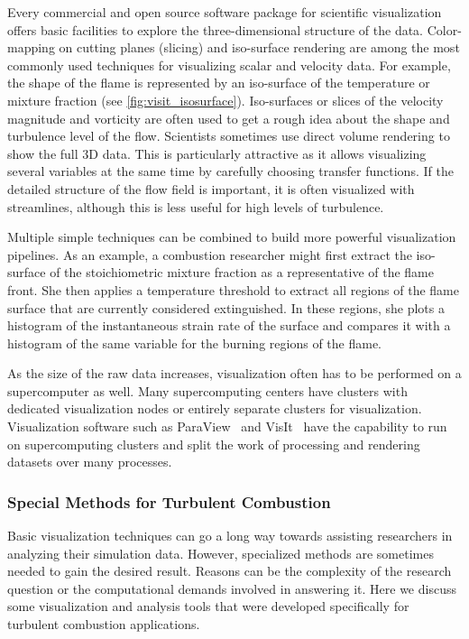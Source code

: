 %
Every commercial and open source software package for scientific visualization
offers basic facilities to explore the three-dimensional structure of the data.
%
Color-mapping on cutting planes (slicing) and iso-surface rendering are among
the most commonly used techniques for visualizing scalar and velocity data.
%
For example, the shape of the flame is represented by an iso-surface of the
temperature or mixture fraction (see \cref{fig:visit_isosurface}).
%
Iso-surfaces or slices of the velocity magnitude and vorticity are often used to
get a rough idea about the shape and turbulence level of the flow.
%
Scientists sometimes use direct volume rendering to show the full \ac{3D} data.
%
This is particularly attractive as it allows visualizing several variables at
the same time by carefully choosing transfer functions.
%
If the detailed structure of the flow field is important, it is often visualized
with streamlines, although this is less useful for high levels of turbulence.
%

%
Multiple simple techniques can be combined to build more powerful visualization
pipelines.
%
As an example, a combustion researcher might first extract the iso-surface of
the stoichiometric mixture fraction as a representative of the flame front.
%
She then applies a temperature threshold to extract all regions of the flame
surface that are currently considered extinguished.
%
In these regions, she plots a histogram of the instantaneous strain rate of the
surface and compares it with a histogram of the same variable for the burning
regions of the flame.
%

%
As the size of the raw data increases, visualization often has to be performed
on a supercomputer as well.
%
Many supercomputing centers have clusters with dedicated visualization nodes or
entirely separate clusters for visualization.
%
Visualization software such as ParaView~\cite{Ahrens2005} and
VisIt~\cite{HPV:VisIt} have the capability to run on supercomputing clusters
and split the work of processing and rendering datasets over many processes.
%
%
\subsubsection{Special Methods for Turbulent Combustion} %
\label{ssub:special_methods_for_turbulent_combustion}
%
Basic visualization techniques can go a long way towards assisting researchers
in analyzing their simulation data.
%
However, specialized methods are sometimes needed to gain the desired result.
%
Reasons can be the complexity of the research question or the computational
demands involved in answering it.
%
Here we discuss some visualization and analysis tools that were developed
specifically for turbulent combustion applications.
%


